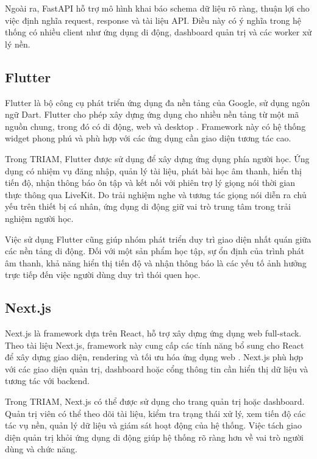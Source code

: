 \documentclass[12pt,a4paper]{report}
\begin{document}
Ngoài ra, FastAPI hỗ trợ mô hình khai báo schema dữ liệu rõ ràng, thuận lợi cho việc định nghĩa request, response và tài liệu API. Điều này có ý nghĩa trong hệ thống có nhiều client như ứng dụng di động, dashboard quản trị và các worker xử lý nền.

\subsection{Flutter}

Flutter là bộ công cụ phát triển ứng dụng đa nền tảng của Google, sử dụng ngôn ngữ Dart. Flutter cho phép xây dựng ứng dụng cho nhiều nền tảng từ một mã nguồn chung, trong đó có di động, web và desktop \cite{flutterDocs}. Framework này có hệ thống widget phong phú và phù hợp với các ứng dụng cần giao diện tương tác cao.

Trong TRIAM, Flutter được sử dụng để xây dựng ứng dụng phía người học. Ứng dụng có nhiệm vụ đăng nhập, quản lý tài liệu, phát bài học âm thanh, hiển thị tiến độ, nhận thông báo ôn tập và kết nối với phiên trợ lý giọng nói thời gian thực thông qua LiveKit. Do trải nghiệm nghe và tương tác giọng nói diễn ra chủ yếu trên thiết bị cá nhân, ứng dụng di động giữ vai trò trung tâm trong trải nghiệm người học.

Việc sử dụng Flutter cũng giúp nhóm phát triển duy trì giao diện nhất quán giữa các nền tảng di động. Đối với một sản phẩm học tập, sự ổn định của trình phát âm thanh, khả năng hiển thị tiến độ và nhận thông báo là các yếu tố ảnh hưởng trực tiếp đến việc người dùng duy trì thói quen học.

\subsection{Next.js}

Next.js là framework dựa trên React, hỗ trợ xây dựng ứng dụng web full-stack. Theo tài liệu Next.js, framework này cung cấp các tính năng bổ sung cho React để xây dựng giao diện, rendering và tối ưu hóa ứng dụng web \cite{nextjsDocs}. Next.js phù hợp với các giao diện quản trị, dashboard hoặc cổng thông tin cần hiển thị dữ liệu và tương tác với backend.

Trong TRIAM, Next.js có thể được sử dụng cho trang quản trị hoặc dashboard. Quản trị viên có thể theo dõi tài liệu, kiểm tra trạng thái xử lý, xem tiến độ các tác vụ nền, quản lý dữ liệu và giám sát hoạt động của hệ thống. Việc tách giao diện quản trị khỏi ứng dụng di động giúp hệ thống rõ ràng hơn về vai trò người dùng và chức năng.
\end{document}
